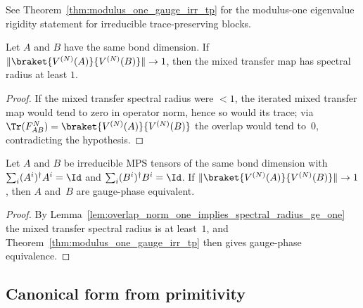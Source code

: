\begin{remark}
    See Theorem~\ref{thm:modulus_one_gauge_irr_tp} for the modulus-one
    eigenvalue rigidity statement for irreducible trace-preserving blocks.
\end{remark}

\begin{lemma}%
    \label{lem:overlap_norm_one_implies_spectral_radius_ge_one}
    \leanok
    Let $A$ and $B$ have the same bond dimension. If
    $\|\braket{V^{(N)}(A)}{V^{(N)}(B)}\| \to 1$, then the mixed transfer map has
    spectral radius at least $1$.
\end{lemma}
\begin{proof}\leanok
    If the mixed transfer spectral radius were $<1$, the iterated mixed transfer
    map would tend to zero in operator norm, hence so would its trace; via
    $\Tr(F_{AB}^N) = \braket{V^{(N)}(A)}{V^{(N)}(B)}$ the overlap would tend
    to~$0$, contradicting the hypothesis.
\end{proof}

\begin{theorem}%
    \label{thm:nt_overlap_norm_one_gauge}
    \leanok
    Let $A$ and $B$ be irreducible MPS tensors of the same bond dimension with
    $\sum_i (A^i)^\dagger A^i = \Id$ and $\sum_i (B^i)^\dagger B^i = \Id$. If
    $\|\braket{V^{(N)}(A)}{V^{(N)}(B)}\| \to 1$, then $A$ and~$B$ are gauge-phase
    equivalent.
\end{theorem}

\begin{proof}\leanok
    By Lemma~\ref{lem:overlap_norm_one_implies_spectral_radius_ge_one} the mixed
    transfer spectral radius is at least~$1$, and
    Theorem~\ref{thm:modulus_one_gauge_irr_tp} then gives gauge-phase equivalence.
\end{proof}

\subsection{Canonical form from primitivity}\label{sec:canonical_from_primitivity}


